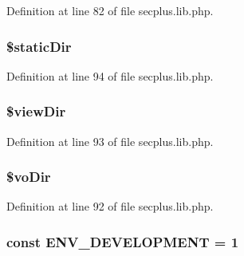 Definition at line 82 of file secplus.lib.php.

\hypertarget{class_sec_plus_1_1_config_a1531855c2cd3af70bc5447db3974d7d7}{
\subsubsection[{\$staticDir}]{\setlength{\rightskip}{0pt plus 5cm}\$staticDir}}
\label{class_sec_plus_1_1_config_a1531855c2cd3af70bc5447db3974d7d7}


Definition at line 94 of file secplus.lib.php.

\hypertarget{class_sec_plus_1_1_config_a004b9a4e7f26647a02a1a2ec1eb4551a}{
\subsubsection[{\$viewDir}]{\setlength{\rightskip}{0pt plus 5cm}\$viewDir}}
\label{class_sec_plus_1_1_config_a004b9a4e7f26647a02a1a2ec1eb4551a}


Definition at line 93 of file secplus.lib.php.

\hypertarget{class_sec_plus_1_1_config_a0e8d14506ce531421f71a921636e349f}{
\subsubsection[{\$voDir}]{\setlength{\rightskip}{0pt plus 5cm}\$voDir}}
\label{class_sec_plus_1_1_config_a0e8d14506ce531421f71a921636e349f}


Definition at line 92 of file secplus.lib.php.

\hypertarget{class_sec_plus_1_1_config_abe4546334d26d358d84c5c068023a59f}{
\subsubsection[{ENV\_\-DEVELOPMENT}]{\setlength{\rightskip}{0pt plus 5cm}const {\bf ENV\_\-DEVELOPMENT} = 1}}
\label{class_sec_plus_1_1_config_abe4546334d26d358d84c5c068023a59f}


